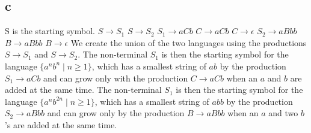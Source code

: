 \documentclass[12pt]{article}
\begin{document}
\subsection*{c} S is the starting symbol. \newline
$S \rightarrow S_1$ \newline
$S \rightarrow S_2$ \newline
$S_1 \rightarrow aCb$ \newline
$C \rightarrow aCb$ \newline
$C \rightarrow \epsilon $ \newline
$S_2 \rightarrow aBbb$ \newline
$B \rightarrow aBbb$ \newline
$B \rightarrow \epsilon $ \newline
We create the union of the two languages using the productions $S \rightarrow S_1$ and
$S \rightarrow S_2$. The non-terminal $S_1$ is then the starting symbol for the language $\{a^{n}b^{n}\mid n \geq 1\}$, which has a smallest string of $ab$ by the production $S_1 \rightarrow aCb$ and can grow only with the production $C \rightarrow aCb$ when an $a$ and $b$ are added at the same time. The non-terminal $S_1$ is then the starting symbol for the language $\{a^{n}b^{2n}\mid n \geq 1\}$, which has a smallest string of $abb$ by the production $S_2 \rightarrow aBbb$ and can grow only by the production $B \rightarrow aBbb$ when an $a$ and two $b$'s are added at the same time.
\end{document}
